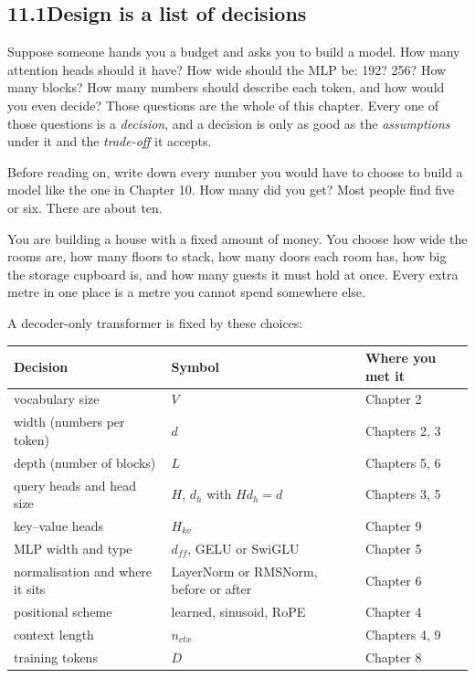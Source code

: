 \subsection*{11.1\quad Design is a list of decisions}

Suppose someone hands you a budget and asks you to build a model. How many attention heads should it have?
How wide should the MLP be: 192? 256? How many blocks? How many numbers should describe each token, and how
would you even decide? Those questions are the whole of this chapter. Every one of those questions is a \emph{decision}, and a
decision is only as good as the \emph{assumptions} under it and the \emph{trade-off} it accepts.

\Predict Before reading on, write down every number you would have to choose to build a model like the
one in Chapter 10. How many did you get? Most people find five or six. There are about ten.

\Picture You are building a house with a fixed amount of money. You choose how wide the rooms are, how
many floors to stack, how many doors each room has, how big the storage cupboard is, and how many guests
it must hold at once. Every extra metre in one place is a metre you cannot spend somewhere else.

\Exactly A decoder-only transformer is fixed by these choices:
\begin{center}
\small
\begin{tabular}{@{}l l l@{}}
\toprule
Decision & Symbol & Where you met it\\
\midrule
vocabulary size & $V$ & Chapter 2\\
width (numbers per token) & $d$ & Chapters 2, 3\\
depth (number of blocks) & $L$ & Chapters 5, 6\\
query heads and head size & $H$, $d_h$ with $H d_h = d$ & Chapters 3, 5\\
key--value heads & $H_{kv}$ & Chapter 9\\
MLP width and type & $d_{ff}$, GELU or SwiGLU & Chapter 5\\
normalisation and where it sits & LayerNorm or RMSNorm, before or after & Chapter 6\\
positional scheme & learned, sinusoid, RoPE & Chapter 4\\
context length & $n_{ctx}$ & Chapters 4, 9\\
training tokens & $D$ & Chapter 8\\
\bottomrule
\end{tabular}
\end{center}

